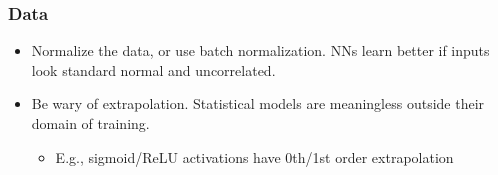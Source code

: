 \begin{frame}
    \frametitle{Data}

    \begin{itemize}
        \item<+-> \alert{Normalize the data, or use batch normalization.}
        NNs learn better if inputs look standard normal and uncorrelated.
        \item<+-> \alert{Be wary of extrapolation.}
        Statistical models are meaningless outside their domain of training.
        \begin{itemize}
            \item E.g., sigmoid/ReLU activations have 0th/1st order extrapolation
        \end{itemize}
    \end{itemize}

    \begin{columns}
        \begin{column}{0.4\textwidth}
            \centering
            \footnotesize

        \end{column}

        \begin{column}{0.6\textwidth}
            \centering
            \footnotesize

        \end{column}
    \end{columns}
\end{frame}

